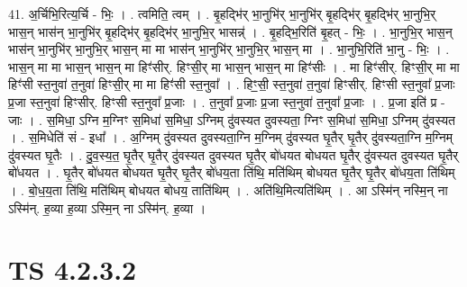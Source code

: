 \documentclass[17pt]{extarticle}
\begin{document}
41. अ॒र्चिभि॒रित्य॒र्चि - भिः॒ । . त्वमिति॒ त्वम् । . बृ॒हद्भि॑र् भा॒नुभि॑र् भा॒नुभि॑र् बृ॒हद्भि॑र् बृ॒हद्भि॑र् भा॒नुभि॒र् भास॒न् भास॑न् भा॒नुभि॑र् बृ॒हद्भि॑र् बृ॒हद्भि॑र् भा॒नुभि॒र् भासन्न्॑ । . बृ॒हद्भि॒रिति॑ बृ॒हत् - भिः॒ । . भा॒नुभि॒र् भास॒न् भास॑न् भा॒नुभि॑र् भा॒नुभि॒र् भास॒न् मा मा भास॑न् भा॒नुभि॑र् भा॒नुभि॒र् भास॒न् मा । . भा॒नुभि॒रिति॑ भा॒नु - भिः॒ । . भास॒न् मा मा भास॒न् भास॒न् मा हिꣳ॑सीर्. हिꣳसी॒र् मा भास॒न् भास॒न् मा हिꣳ॑सीः । . मा हिꣳ॑सीर्. हिꣳसी॒र् मा मा हिꣳ॑सी स्त॒नुवा॑ त॒नुवा॑ हिꣳसी॒र् मा मा हिꣳ॑सी स्त॒नुवा᳚ । . हिꣳ॒॒सी॒ स्त॒नुवा॑ त॒नुवा॑ हिꣳसीर्. हिꣳसी स्त॒नुवा᳚ प्र॒जाः प्र॒जा स्त॒नुवा॑ हिꣳसीर्. हिꣳसी स्त॒नुवा᳚ प्र॒जाः । . त॒नुवा᳚ प्र॒जाः प्र॒जा स्त॒नुवा॑ त॒नुवा᳚ प्र॒जाः । . प्र॒जा इति॑ प्र - जाः । . स॒मिधा॒ ऽग्नि म॒ग्निꣳ स॒मिधा॑ स॒मिधा॒ ऽग्निम् दु॑वस्यत दुवस्यता॒ ग्निꣳ स॒मिधा॑ स॒मिधा॒ ऽग्निम् दु॑वस्यत । . स॒मिधेति॑ सं - इधा᳚ । . अ॒ग्निम् दु॑वस्यत दुवस्यता॒ग्नि म॒ग्निम् दु॑वस्यत घृ॒तैर् घृ॒तैर् दु॑वस्यता॒ग्नि म॒ग्निम् दु॑वस्यत घृ॒तैः । . दु॒व॒स्य॒त॒ घृ॒तैर् घृ॒तैर् दु॑वस्यत दुवस्यत घृ॒तैर् बो॑धयत बोधयत घृ॒तैर् दु॑वस्यत दुवस्यत घृ॒तैर् बो॑धयत । . घृ॒तैर् बो॑धयत बोधयत घृ॒तैर् घृ॒तैर् बो॑धय॒ता ति॑थि॒ मति॑थिम् बोधयत घृ॒तैर् घृ॒तैर् बो॑धय॒ता ति॑थिम् । . बो॒ध॒य॒ता ति॑थि॒ मति॑थिम् बोधयत बोधय॒ ताति॑थिम् । . अति॑थि॒मित्यति॑थिम् । . आ ऽस्मि॑न् नस्मि॒न् ना ऽस्मि॑न्. ह॒व्या ह॒व्या ऽस्मि॒न् ना ऽस्मि॑न्. ह॒व्या । \newline
\pagebreak
{}

\section{ TS 4.2.3.2 }
\end{document}
